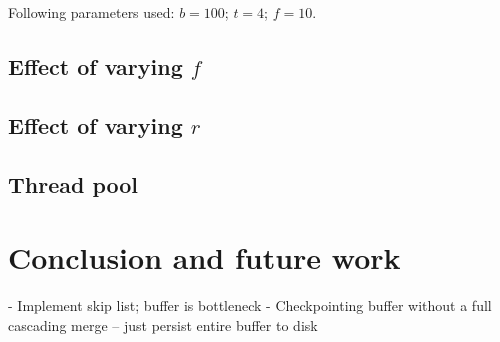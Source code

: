 \documentclass{acm}
\begin{document}
Following parameters used: $b = 100$; $t = 4$; $f = 10$.

\subsection{Effect of varying $f$}

\subsection{Effect of varying $r$}

\subsection{Thread pool}



\section{Conclusion and future work}

- Implement skip list; buffer is bottleneck
- Checkpointing buffer without a full cascading merge -- just persist entire buffer to disk
\end{document}
